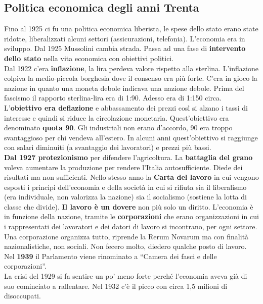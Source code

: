 \subsection{Politica economica degli anni Trenta}
Fino al 1925 ci fu una politica economica liberista, le spese dello stato erano state ridotte, 
liberalizzati alcuni settori (assicurazioni, telefonia). L'economia era in sviluppo. Dal 1925 
Mussolini cambia strada. Passa ad una fase di \textbf{intervento dello stato} nella vita economica
con obiettivi politici.\\
Dal 1922 c'era \textbf{inflazione}, la lira perdeva valore rispetto alla sterlina. L'inflazione 
colpiva la medio-piccola borghesia dove il consenso era più forte. C'era in gioco la nazione in 
quanto una moneta debole indicava una nazione debole. Prima del fascismo il rapporto sterlina-lira
era di 1:90. Adesso era di 1:150 circa. L'\textbf{obiettivo era deflazione} e abbassamento dei prezzi
così si alzano i tassi di interesse e quindi si riduce la circolazione monetaria. Quest'obiettivo era
denominato \textbf{quota 90}. Gli industriali non erano d'accordo, 90 era troppo svantaggioso per chi
vendeva all'estero. In alcuni anni quest'obiettivo si raggiunge con salari diminuiti (a svantaggio 
dei lavoratori) e prezzi più bassi.\\
\textbf{Dal 1927 protezionismo} per difendere l'agricoltura. La \textbf{battaglia del grano} voleva
aumentare la produzione per rendere l'Italia autosufficiente. Diede dei risultati ma non sufficienti.
Nello stesso anno la  \textbf{Carta del lavoro} in cui vengono esposti i principi dell'economia e
della società in cui si rifiuta sia il liberalismo (era individuale, non valorizza la nazione) sia
il socialismo (sostiene la lotta di classe che divide). \textbf{Il lavoro è un dovere} non più solo
un diritto. L'economia è in funzione della nazione, tramite le \textbf{corporazioni} che erano
organizzazioni in cui i rappresentati dei lavoratori e dei datori di lavoro si incontrano, per ogni
settore. Una corporazione organizza tutto, riprende la Rerum Novarum ma con finalità nazionalistiche,
non sociali. Non fecero molto, diedero qualche posto di lavoro.\\
Nel \textbf{1939} il Parlamento viene rinominato a ``Camera dei fasci e delle corporazioni''. \\
La crisi del 1929 si fa sentire un po' meno forte perché l'economia aveva già di suo cominciato a 
rallentare. Nel 1932 c'è il picco con circa 1,5 milioni di disoccupati.


